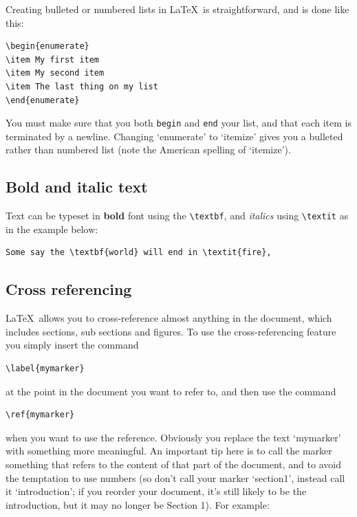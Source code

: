 \begin{refsection}
Creating bulleted or numbered lists in \LaTeX\ is straightforward, and is done like this:

\begin{verbatim}
\begin{enumerate}
\item My first item
\item My second item
\item The last thing on my list
\end{enumerate}
\end{verbatim}
%
You must make sure that you both \texttt{begin} and \texttt{end} your list, and that each item is terminated by a newline. Changing `enumerate' to `itemize' gives you a bulleted rather than numbered list (note the American spelling of `itemize').  

\subsection{Bold and italic text}
Text can be typeset in \textbf{bold} font using the \verb|\textbf|, and \textit{italics} using \verb|\textit| as in the example below:

\begin{verbatim}
Some say the \textbf{world} will end in \textit{fire},
\end{verbatim}

\subsection{Cross referencing}

\LaTeX\ allows you to cross-reference almost anything in the document, which includes sections, sub sections and figures. To use the cross-referencing feature you simply insert the command 
\begin{verbatim}
\label{mymarker}
\end{verbatim}
at the point in the document you want to refer to, and then use the command

\begin{verbatim}
\ref{mymarker}
\end{verbatim}
when you want to use the reference. Obviously you replace the text `mymarker' with something more meaningful. An important tip here is to call the marker something that refers to the content of that part of the document, and to avoid the temptation to use numbers (so don't call your marker `section1', instead call it `introduction'; if you reorder your document, it's still likely to be the introduction, but it may no longer be Section 1). For example:


\end{refsection}
